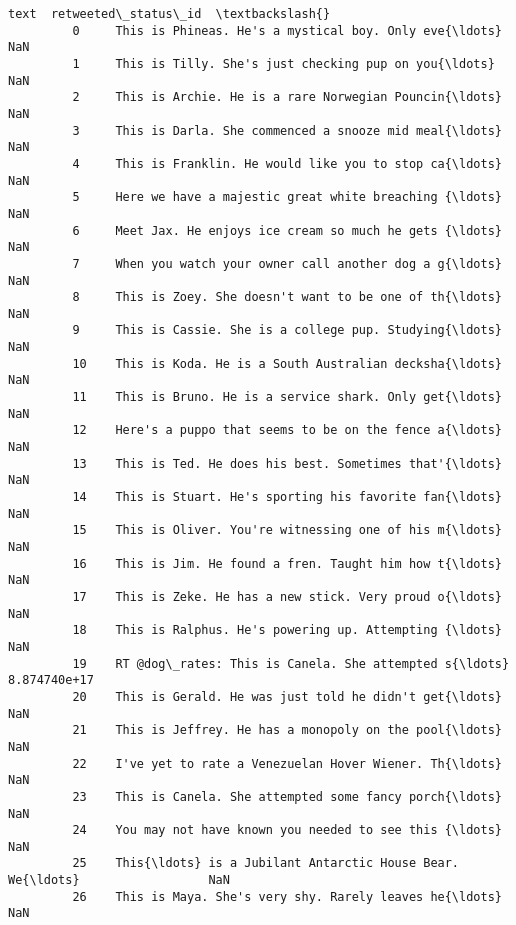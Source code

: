 \documentclass[11pt]{article}
\begin{document}
\begin{Verbatim}[commandchars=\\\{\}]
                                                            text  retweeted\_status\_id  \textbackslash{}
         0     This is Phineas. He's a mystical boy. Only eve{\ldots}                  NaN   
         1     This is Tilly. She's just checking pup on you{\ldots}                  NaN   
         2     This is Archie. He is a rare Norwegian Pouncin{\ldots}                  NaN   
         3     This is Darla. She commenced a snooze mid meal{\ldots}                  NaN   
         4     This is Franklin. He would like you to stop ca{\ldots}                  NaN   
         5     Here we have a majestic great white breaching {\ldots}                  NaN   
         6     Meet Jax. He enjoys ice cream so much he gets {\ldots}                  NaN   
         7     When you watch your owner call another dog a g{\ldots}                  NaN   
         8     This is Zoey. She doesn't want to be one of th{\ldots}                  NaN   
         9     This is Cassie. She is a college pup. Studying{\ldots}                  NaN   
         10    This is Koda. He is a South Australian decksha{\ldots}                  NaN   
         11    This is Bruno. He is a service shark. Only get{\ldots}                  NaN   
         12    Here's a puppo that seems to be on the fence a{\ldots}                  NaN   
         13    This is Ted. He does his best. Sometimes that'{\ldots}                  NaN   
         14    This is Stuart. He's sporting his favorite fan{\ldots}                  NaN   
         15    This is Oliver. You're witnessing one of his m{\ldots}                  NaN   
         16    This is Jim. He found a fren. Taught him how t{\ldots}                  NaN   
         17    This is Zeke. He has a new stick. Very proud o{\ldots}                  NaN   
         18    This is Ralphus. He's powering up. Attempting {\ldots}                  NaN   
         19    RT @dog\_rates: This is Canela. She attempted s{\ldots}         8.874740e+17   
         20    This is Gerald. He was just told he didn't get{\ldots}                  NaN   
         21    This is Jeffrey. He has a monopoly on the pool{\ldots}                  NaN   
         22    I've yet to rate a Venezuelan Hover Wiener. Th{\ldots}                  NaN   
         23    This is Canela. She attempted some fancy porch{\ldots}                  NaN   
         24    You may not have known you needed to see this {\ldots}                  NaN   
         25    This{\ldots} is a Jubilant Antarctic House Bear. We{\ldots}                  NaN   
         26    This is Maya. She's very shy. Rarely leaves he{\ldots}                  NaN   

\end{Verbatim}
\end{document}
